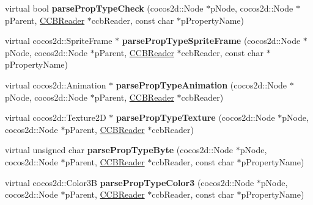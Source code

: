 \begin{DoxyCompactItemize}
virtual bool {\bfseries parse\+Prop\+Type\+Check} (cocos2d\+::\+Node $\ast$p\+Node, cocos2d\+::\+Node $\ast$p\+Parent, \hyperlink{classcocosbuilder_1_1CCBReader}{C\+C\+B\+Reader} $\ast$ccb\+Reader, const char $\ast$p\+Property\+Name)
\item 
\mbox{\label{classcocosbuilder_1_1NodeLoader_ae44064a1a48f28c873ee7ca732d368a8}} 
virtual cocos2d\+::\+Sprite\+Frame $\ast$ {\bfseries parse\+Prop\+Type\+Sprite\+Frame} (cocos2d\+::\+Node $\ast$p\+Node, cocos2d\+::\+Node $\ast$p\+Parent, \hyperlink{classcocosbuilder_1_1CCBReader}{C\+C\+B\+Reader} $\ast$ccb\+Reader, const char $\ast$p\+Property\+Name)
\item 
\mbox{\label{classcocosbuilder_1_1NodeLoader_aefcca033fb0cf6a49a56d4ecfdef0f09}} 
virtual cocos2d\+::\+Animation $\ast$ {\bfseries parse\+Prop\+Type\+Animation} (cocos2d\+::\+Node $\ast$p\+Node, cocos2d\+::\+Node $\ast$p\+Parent, \hyperlink{classcocosbuilder_1_1CCBReader}{C\+C\+B\+Reader} $\ast$ccb\+Reader)
\item 
\mbox{\label{classcocosbuilder_1_1NodeLoader_a0dd8ee9e2974549a2af590838019f956}} 
virtual cocos2d\+::\+Texture2D $\ast$ {\bfseries parse\+Prop\+Type\+Texture} (cocos2d\+::\+Node $\ast$p\+Node, cocos2d\+::\+Node $\ast$p\+Parent, \hyperlink{classcocosbuilder_1_1CCBReader}{C\+C\+B\+Reader} $\ast$ccb\+Reader)
\item 
\mbox{\label{classcocosbuilder_1_1NodeLoader_af5fdc1291a8f29428e7fb8d8cee976a3}} 
virtual unsigned char {\bfseries parse\+Prop\+Type\+Byte} (cocos2d\+::\+Node $\ast$p\+Node, cocos2d\+::\+Node $\ast$p\+Parent, \hyperlink{classcocosbuilder_1_1CCBReader}{C\+C\+B\+Reader} $\ast$ccb\+Reader, const char $\ast$p\+Property\+Name)
\item 
\mbox{\label{classcocosbuilder_1_1NodeLoader_ab09bde7302849680693fab0729db8a98}} 
virtual cocos2d\+::\+Color3B {\bfseries parse\+Prop\+Type\+Color3} (cocos2d\+::\+Node $\ast$p\+Node, cocos2d\+::\+Node $\ast$p\+Parent, \hyperlink{classcocosbuilder_1_1CCBReader}{C\+C\+B\+Reader} $\ast$ccb\+Reader, const char $\ast$p\+Property\+Name)
\item 
\mbox{\label{classcocosbuilder_1_1NodeLoader_acf4b271c53250d67c5bd9e617b71a00b}} 

\end{DoxyCompactItemize}
